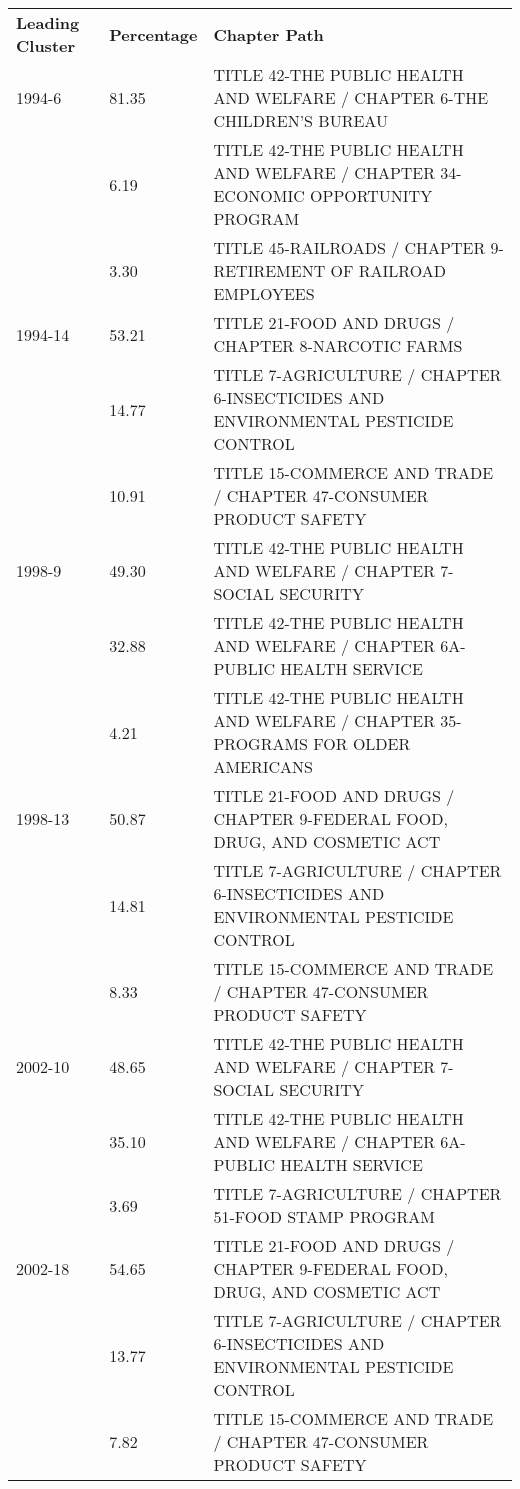 \bgroup
\def\arraystretch{1.08}
\hspace*{-4em}\begin{tabular}{p{}R{0.08\textwidth}p{0.9\textwidth}}
\textbf{Leading Cluster}&\textbf{Percentage}&\textbf{Chapter Path}\\[6pt]
1994-6&81.35 &	TITLE 42-THE PUBLIC HEALTH AND WELFARE / CHAPTER 6-THE CHILDREN'S BUREAU\\
&6.19 &	TITLE 42-THE PUBLIC HEALTH AND WELFARE / CHAPTER 34-ECONOMIC OPPORTUNITY PROGRAM\\
&3.30 &	TITLE 45-RAILROADS / CHAPTER 9-RETIREMENT OF RAILROAD EMPLOYEES\\
1994-14&53.21 &	TITLE 21-FOOD AND DRUGS / CHAPTER 8-NARCOTIC FARMS\\
&14.77 &	TITLE 7-AGRICULTURE / CHAPTER 6-INSECTICIDES AND ENVIRONMENTAL PESTICIDE CONTROL\\
&10.91 &	TITLE 15-COMMERCE AND TRADE / CHAPTER 47-CONSUMER PRODUCT SAFETY\\[6pt]
1998-9&49.30 &	TITLE 42-THE PUBLIC HEALTH AND WELFARE / CHAPTER 7-SOCIAL SECURITY\\
&32.88 &	TITLE 42-THE PUBLIC HEALTH AND WELFARE / CHAPTER 6A-PUBLIC HEALTH SERVICE\\
&4.21 &	TITLE 42-THE PUBLIC HEALTH AND WELFARE / CHAPTER 35-PROGRAMS FOR OLDER AMERICANS\\
1998-13&50.87 &	TITLE 21-FOOD AND DRUGS / CHAPTER 9-FEDERAL FOOD, DRUG, AND COSMETIC ACT\\
&14.81 &	TITLE 7-AGRICULTURE / CHAPTER 6-INSECTICIDES AND ENVIRONMENTAL PESTICIDE CONTROL\\
&8.33 &	TITLE 15-COMMERCE AND TRADE / CHAPTER 47-CONSUMER PRODUCT SAFETY\\[6pt]
2002-10&48.65 &	TITLE 42-THE PUBLIC HEALTH AND WELFARE / CHAPTER 7-SOCIAL SECURITY\\
&35.10 &	TITLE 42-THE PUBLIC HEALTH AND WELFARE / CHAPTER 6A-PUBLIC HEALTH SERVICE\\
&3.69 &	TITLE 7-AGRICULTURE / CHAPTER 51-FOOD STAMP PROGRAM\\
2002-18&54.65 &	TITLE 21-FOOD AND DRUGS / CHAPTER 9-FEDERAL FOOD, DRUG, AND COSMETIC ACT\\
&13.77 &	TITLE 7-AGRICULTURE / CHAPTER 6-INSECTICIDES AND ENVIRONMENTAL PESTICIDE CONTROL\\
&7.82 &	TITLE 15-COMMERCE AND TRADE / CHAPTER 47-CONSUMER PRODUCT SAFETY\\[6pt]

\end{tabular}
